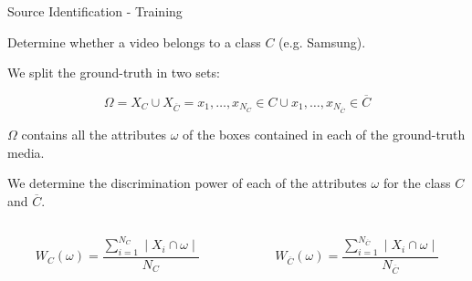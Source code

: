 \begin{tframe}{Source Identification - Training}

\vspace{0.1cm}

Determine whether a video belongs to a class $C$ (e.g. Samsung).

\vspace{0.1cm}

We split the ground-truth in two sets:

$$ \Omega = X_{C} \cup X_{\overline{C}} = {x_{1}, \ldots, x_{N_{C}} \in C} \cup {x_{1}, \ldots, x_{N_{\overline{C}}} \in \overline{C}} $$

$\Omega$ contains all the attributes $\omega$ of the boxes contained in each of the ground-truth media.

\vspace{0.5cm}

We determine the discrimination power of each of the attributes $\omega$ for the class $C$ and $\overline{C}$.

\begin{minipage}{\textwidth}
\begin{columns}[T]

\begin{column}{0.45\textwidth}
$$  W_{C}(\omega) = \dfrac{\sum\limits_{i=1}^{N_{C}}\mid X_{i} \cap \omega \mid}{N_{C}} $$
\end{column}

\begin{column}{0.45\textwidth}
$$  W_{\overline{C}}(\omega) = \dfrac{\sum\limits_{i=1}^{N_{\overline{C}}}\mid X_{i} \cap \omega \mid}{N_{\overline{C}}} $$
\end{column}

\end{columns}
\end{minipage}

\end{tframe}

